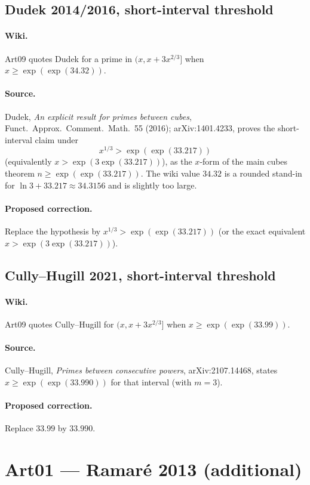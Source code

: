 \documentclass[11pt,a4paper]{article}
\begin{document}
\subsection{Dudek 2014/2016, short-interval threshold}
\label{err:dudek-threshold}
\paragraph{Wiki.}
Art09 quotes Dudek for a prime in $(x,x+3x^{2/3}]$ when
$x\ge\exp(\exp(34.32))$.
\paragraph{Source.}
Dudek, \emph{An explicit result for primes between cubes},
Funct.\ Approx.\ Comment.\ Math.\ 55 (2016); arXiv:1401.4233, proves the
short-interval claim under
\[
x^{1/3}>\exp(\exp(33.217))
\]
(equivalently $x>\exp(3\exp(33.217))$), as the $x$-form of the main
cubes theorem $n\ge\exp(\exp(33.217))$.  The wiki value $34.32$ is a
rounded stand-in for $\ln 3+33.217\approx 34.3156$ and is slightly too
large.
\paragraph{Proposed correction.}
Replace the hypothesis by $x^{1/3}>\exp(\exp(33.217))$ (or the exact
equivalent $x>\exp(3\exp(33.217))$).

\subsection{Cully--Hugill 2021, short-interval threshold}
\label{err:cully-hugill-threshold}
\paragraph{Wiki.}
Art09 quotes Cully--Hugill for $(x,x+3x^{2/3}]$ when
$x\ge\exp(\exp(33.99))$.
\paragraph{Source.}
Cully--Hugill, \emph{Primes between consecutive powers},
arXiv:2107.14468, states $x\ge\exp(\exp(33.990))$ for that interval
(with $m=3$).
\paragraph{Proposed correction.}
Replace $33.99$ by $33.990$.

\section{Art01 --- Ramaré 2013 (additional)}
\end{document}
